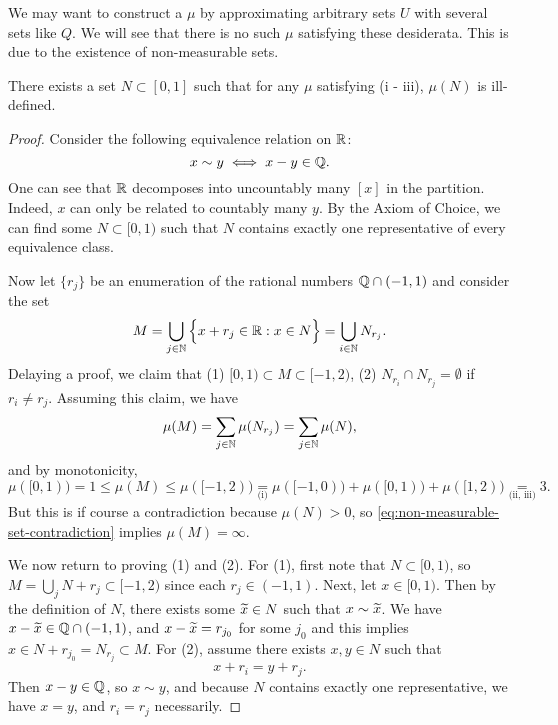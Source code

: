 \documentclass[12pt]{article} %
\begin{document}
\noindent We may want to construct a $\mu$ by approximating arbitrary sets $U$ with several sets like $Q$. We will see that there is no such $\mu$ satisfying these desiderata. This is due to the existence of non-measurable sets.

\begin{lemma}
    There exists a set $N \subset [0,1]$ such that for any $\mu$ satisfying (i - iii), $\mu(N)$ is ill-defined.
\end{lemma}

\begin{proof}
    Consider the following equivalence relation on $\mathbb{R}$: \[x \sim y \iff x - y \in \mathbb{Q}.\] One can see that $\mathbb{R}$ decomposes into uncountably many $[x]$ in the partition. Indeed, $x$ can only be related to countably many $y$. By the Axiom of Choice, we can find some $N \subset [0,1)$ such that $N$ contains exactly one representative of every equivalence class.

    Now let $\{r_j\}$ be an enumeration of the rational numbers $\mathbb{Q} \cap (-1,1)$ and consider the set \[M = \bigcup_{j \in \mathbb{N}} \Big\{x + r_j \in \mathbb{R} : x \in N \Big\} = \bigcup_{i \in \mathbb{N}} N_{r_j}.\] Delaying a proof, we claim that (1) $[0,1) \subset M \subset [-1,2)$, (2) $N_{r_i} \cap N_{r_j} = \emptyset$ if $r_i \neq r_j$. Assuming this claim, we have \begin{align}\label{eq:non-measurable-set-contradiction}
        \mu(M) = \sum_{j \in \mathbb{N}} \mu(N_{r_j}) = \sum_{j \in \mathbb{N}} \mu(N),
    \end{align} and by monotonicity, \[\mu([0,1)) = 1 \leq \mu(M) \leq \mu([-1,2)) \underset{\text{(i)}}{=} \mu([-1,0)) + \mu([0,1)) + \mu([1,2)) \underset{\text{(ii, iii)}}{=} 3.\] But this is if course a contradiction because $\mu(N) > 0$, so \cref{eq:non-measurable-set-contradiction} implies $\mu(M) = \infty$.

    We now return to proving (1) and (2). For (1), first note that $N \subset [0,1)$, so $M = \bigcup_j N + r_j \subset [-1,2)$ since each $r_j \in (-1,1)$. Next, let $x \in [0,1)$. Then by the definition of $N$, there exists some $\widetilde{x} \in N$ such that $x \sim \widetilde{x}$. We have $x - \widetilde{x} \in \mathbb{Q} \cap (-1, 1)$, and $x-\widetilde{x} = r_{j_0}$ for some $j_0$ and this implies $x \in N + r_{j_0} = N_{r_j} \subset M$. For (2), assume there exists $x, y \in N$ such that \[x + r_i = y + r_j.\] Then $x - y \in \mathbb{Q}$, so $x \sim y$, and because $N$ contains exactly one representative, we have $x = y$, and $r_i = r_j$ necessarily.
\end{proof}
\end{document}
